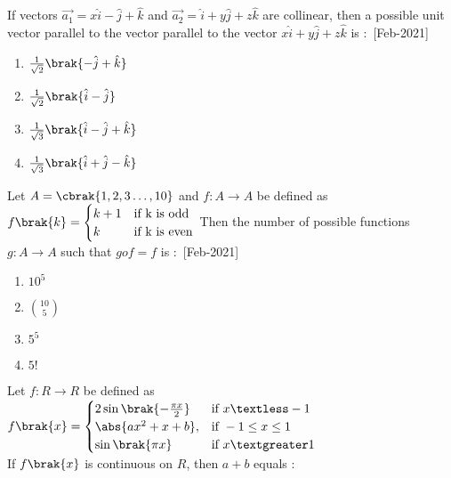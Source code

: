    \iffalse
    \title{2021}
    \author{EE24BTECH11021}
    \section{mcq-single}
\fi
  \item If vectors $\overrightarrow{a_1}=x\hat{i}-\hat{j}+\hat{k}$ and $\overrightarrow{a_2}=\hat{i}+y\hat{j}+z\hat{k}$ are collinear, then a possible unit vector parallel to the vector parallel to the vector $x\hat{i}+y\hat{j}+z\hat{k}$ is $\colon$
    \hfill{[Feb-2021]}
        \begin{enumerate}
            \item $\frac{1}{\sqrt{2}}\brak{-\hat{j}+\hat{k}}$
            \item $\frac{1}{\sqrt{2}}\brak{\hat{i}-\hat{j}}$
            \item $\frac{1}{\sqrt{3}}\brak{\hat{i}-\hat{j}+\hat{k}}$
            \item $\frac{1}{\sqrt{3}}\brak{\hat{i}+\hat{j}-\hat{k}}$
        \end{enumerate}
    \item Let $A=\cbrak{1,2,3\dots,10}$ and $f\colon A\rightarrow A$ be defined as $f\brak{k}=
        \begin{cases}
            k+1 & \text{if  k is odd}\\
            k & \text{if  k is even}
        \end{cases}    
    $
    Then the number of possible functions $g\colon A\rightarrow A$ such that $gof=f$ is $\colon$
    \hfill{[Feb-2021]}
        \begin{enumerate}
            \item $10^5$
            \item $\binom{10}{5}$
            \item $5^5$
            \item $5!$
        \end{enumerate}
    \item Let $f\colon R\rightarrow R$ be defined as $f\brak{x}=
        \begin{cases}
            2\sin\brak{-\frac{\pi x}{2}} & \text{if } x\textless -1 \\
            \abs{ax^2+x+b}, & \text{if } -1\leq x\leq 1 \\
            \sin\brak{\pi x} & \text{if } x\textgreater 1
        \end{cases}
        $\\
        If $f\brak{x}$ is continuous on $R$, then $a+b$ equals $\colon$
